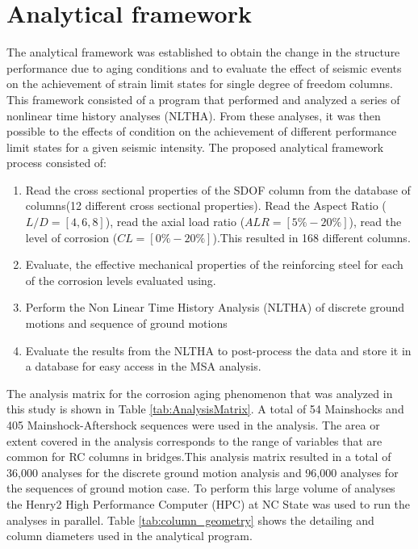 \section{Analytical framework}

The analytical framework was  established to obtain the change in the structure performance   due to aging conditions and to evaluate the effect of seismic events  on the achievement of strain limit states for  single degree of freedom columns. This framework consisted of a program that performed  and analyzed a series of nonlinear time history analyses (NLTHA). From these analyses, it was then possible to the effects of condition on the achievement of different performance limit states for a given seismic intensity. The proposed analytical framework process consisted of:

\begin{enumerate}
	\item Read the cross sectional properties of the SDOF column from the database of columns(12 different cross sectional properties). Read the Aspect Ratio ($L/D=[4,6,8]$), read the axial load ratio ($ALR=[5\%-20\%]$), read the level of corrosion ($CL=[0\% -20\%]$).This resulted in 168 different columns.
	\item Evaluate, the effective mechanical properties of the reinforcing steel for each of the corrosion levels evaluated using.
	\item Perform the Non Linear Time History Analysis (NLTHA) of discrete ground motions and sequence of ground motions
	\item Evaluate the results from the NLTHA to post-process the data and store it in a database for easy access in the MSA analysis.
\end{enumerate}

The analysis matrix for the corrosion aging phenomenon that was analyzed in this study is shown in Table \ref{tab:AnalysisMatrix}. A total of 54 Mainshocks and 405 Mainshock-Aftershock sequences were used in the analysis. The area or extent covered in the analysis corresponds to the range of variables that are common for RC columns in bridges.This analysis matrix resulted in a total of 36,000 analyses for the discrete ground motion analysis and 96,000 analyses for the sequences of ground motion case. To perform this large volume of analyses the Henry2 High Performance Computer (HPC) at NC State was used to run the analyses in parallel. Table \ref{tab:column_geometry} shows the detailing and column diameters used in the analytical program.

